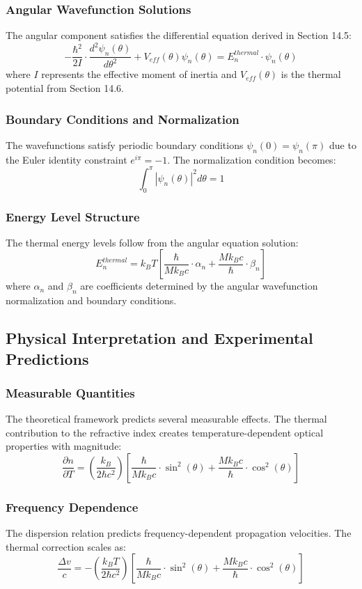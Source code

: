﻿\documentclass[12pt]{article}
\begin{document}
\subsubsection{Angular Wavefunction Solutions}
The angular component satisfies the differential equation derived in Section 14.5:
$$-\frac{\hbar^2}{2I} \cdot \frac{d^2\psi_n(\theta)}{d\theta^2} + V_{eff}(\theta)\psi_n(\theta) = E_n^{thermal} \cdot \psi_n(\theta)$$
where $I$ represents the effective moment of inertia and $V_{eff}(\theta)$ is the thermal potential from Section 14.6.

\subsubsection{Boundary Conditions and Normalization}
The wavefunctions satisfy periodic boundary conditions $\psi_n(0) = \psi_n(\pi)$ due to the Euler identity constraint $e^{i\pi} = -1$. The normalization condition becomes:
$$\int_0^\pi |\psi_n(\theta)|^2 d\theta = 1$$

\subsubsection{Energy Level Structure}
The thermal energy levels follow from the angular equation solution:
$$E_n^{thermal} = k_B T\left[\frac{\hbar}{Mk_Bc} \cdot \alpha_n + \frac{Mk_Bc}{\hbar} \cdot \beta_n\right]$$
where $\alpha_n$ and $\beta_n$ are coefficients determined by the angular wavefunction normalization and boundary conditions.

\subsection{Physical Interpretation and Experimental Predictions}

\subsubsection{Measurable Quantities}
The theoretical framework predicts several measurable effects. The thermal contribution to the refractive index creates temperature-dependent optical properties with magnitude:
$$\frac{\partial n}{\partial T} = \left(\frac{k_B}{2\hbar c^2}\right)\left[\frac{\hbar}{Mk_Bc}\cdot\sin^2(\theta) + \frac{Mk_Bc}{\hbar}\cdot\cos^2(\theta)\right]$$

\subsubsection{Frequency Dependence}
The dispersion relation predicts frequency-dependent propagation velocities. The thermal correction scales as:
$$\frac{\Delta v}{c} = -\left(\frac{k_B T}{2\hbar c^2}\right)\left[\frac{\hbar}{Mk_Bc}\cdot\sin^2(\theta) + \frac{Mk_Bc}{\hbar}\cdot\cos^2(\theta)\right]$$
\end{document}
